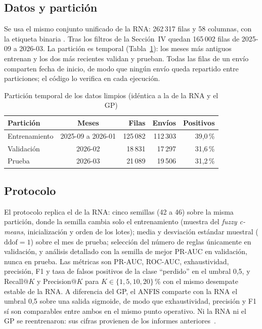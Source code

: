 \documentclass[conference]{IEEEtran}
\newcommand{\col}[1]{\texttt{\detokenize{#1}}}
\begin{document}
\subsection{Datos y partición}
\label{sec:datos}

Se usa el mismo conjunto unificado de la RNA: 262\,317 filas y 58 columnas,
con la etiqueta binaria \col{is_lost}. Tras los filtros de la Sección~IV
quedan 165\,002 filas de 2025-09 a 2026-03. La partición es temporal
(Tabla~\ref{tab:particion}): los meses más antiguos entrenan y los dos más
recientes validan y prueban. Todas las filas de un envío comparten fecha de
inicio, de modo que ningún envío queda repartido entre particiones; el código
lo verifica en cada ejecución.

\begin{table}[htbp]
\caption{Partición temporal de los datos limpios (idéntica a la de la RNA y el GP)}
\label{tab:particion}
\centering
\footnotesize
\begin{tabular}{lcrrr}
\toprule
\textbf{Partición} & \textbf{Meses} & \textbf{Filas} & \textbf{Envíos} & \textbf{Positivos}\\
\midrule
Entrenamiento & 2025-09 a 2026-01 & 125\,082 & 112\,303 & 39,0\,\%\\
Validación & 2026-02 & 18\,831 & 17\,297 & 31,6\,\%\\
Prueba & 2026-03 & 21\,089 & 19\,506 & 31,2\,\%\\
\bottomrule
\end{tabular}
\end{table}

\subsection{Protocolo}

El protocolo replica el de la RNA: cinco semillas (42 a 46) sobre la misma
partición, donde la semilla cambia solo el entrenamiento (muestra del
\textit{fuzzy c-means}, inicialización y orden de los lotes); media y
desviación estándar muestral ($\mathrm{ddof}=1$) sobre el mes de prueba;
selección del número de reglas únicamente en validación, y análisis
detallado con la semilla de mejor PR-AUC en validación, nunca en prueba. Las
métricas son PR-AUC, ROC-AUC, exhaustividad, precisión, F1 y tasa de falsos
positivos de la clase ``perdido'' en el umbral 0,5, y Recall@$K$ y
Precision@$K$ para $K \in \{1, 5, 10, 20\}$\,\% con el mismo desempate
estable de la RNA. A diferencia del GP, el ANFIS comparte con la RNA el
umbral 0,5 sobre una salida sigmoide, de modo que exhaustividad, precisión y
F1 sí son comparables entre ambos en el mismo punto operativo. Ni la RNA ni
el GP se reentrenaron: sus cifras provienen de los informes
anteriores~\cite{informe_rna,paper_gp}.
\end{document}
